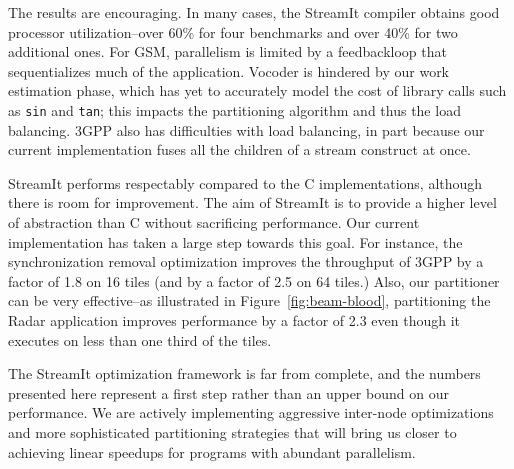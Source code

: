 The results are encouraging.  In many cases, the StreamIt compiler
obtains good processor utilization--over 60\% for four benchmarks and
over 40\% for two additional ones.  For GSM, parallelism is limited by
a feedbackloop that sequentializes much of the application.  Vocoder
is hindered by our work estimation phase, which has yet to accurately
model the cost of library calls such as {\tt sin} and {\tt tan}; this
impacts the partitioning algorithm and thus the load balancing.  3GPP
also has difficulties with load balancing, in part because our current
implementation fuses all the children of a stream construct at once.

StreamIt performs respectably compared to the C implementations,
although there is room for improvement.  The aim of StreamIt is to
provide a higher level of abstraction than C without sacrificing
performance.  Our current implementation has taken a large step
towards this goal.  For instance, the synchronization removal
optimization improves the throughput of 3GPP by a factor of 1.8 on 16
tiles (and by a factor of 2.5 on 64 tiles.)  Also, our partitioner can
be very effective--as illustrated in Figure~\ref{fig:beam-blood},
partitioning the Radar application improves performance by a factor
of 2.3 even though it executes on less than one third of the tiles.


The StreamIt optimization framework is far from complete, and the
numbers presented here represent a first step rather than an upper
bound on our performance.  We are actively implementing aggressive
inter-node optimizations and more sophisticated partitioning
strategies that will bring us closer to achieving linear speedups for
programs with abundant parallelism.

